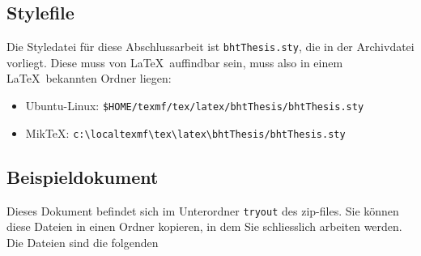 \subsection*{Stylefile}
Die  Styledatei für diese  Abschlussarbeit ist  \texttt{bhtThesis.sty}, die  in der
Archivdatei vorliegt.  Diese muss von \LaTeX\  auffindbar sein, muss  also in einem
\LaTeX\ bekannten Ordner liegen:
\begin{itemize}
\item Ubuntu-Linux: \verb|$HOME/texmf/tex/latex/bhtThesis/bhtThesis.sty|
\item MikTeX: \verb|c:\localtexmf\tex\latex\bhtThesis/bhtThesis.sty|
\end{itemize}


\subsection*{Beispieldokument}
Dieses  Dokument befindet sich  im Unterordner  \texttt{tryout} des  zip-files. Sie
können diese  Dateien in  einen Ordner kopieren,  in dem Sie  schliesslich arbeiten
werden. Die Dateien sind die folgenden

